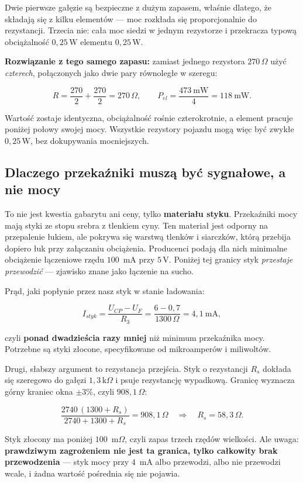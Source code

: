 \documentclass[a4paper,11pt]{article}
\newcommand{\ohm}{\,\Omega}
\newcommand{\kohm}{\,\mathrm{k}\Omega}
\newcommand{\volt}{\,\mathrm{V}}
\newcommand{\watt}{\,\mathrm{W}}
\begin{document}
Dwie pierwsze gałęzie są bezpieczne z dużym zapasem, właśnie dlatego, że składają
się z kilku elementów --- moc rozkłada się proporcjonalnie do rezystancji. Trzecia
nie: cała moc siedzi w jednym rezystorze i przekracza typową obciążalność
$0{,}25\watt$ elementu $0{,}25\watt$.

\textbf{Rozwiązanie z tego samego zapasu:} zamiast jednego rezystora $270\ohm$
użyć \emph{czterech}, połączonych jako dwie pary równoległe w szeregu:

\[
R=\frac{270}{2}+\frac{270}{2}=270\ohm ,
\qquad
P_{el}=\frac{473\ \mathrm{mW}}{4}=118\ \mathrm{mW}.
\]

Wartość zostaje identyczna, obciążalność rośnie czterokrotnie, a element pracuje
poniżej połowy swojej mocy. Wszystkie rezystory pojazdu mogą więc być zwykłe
$0{,}25\watt$, bez dokupywania mocniejszych.

\subsection{Dlaczego przekaźniki muszą być sygnałowe, a nie mocy}
\label{sec:przekazniki}

To nie jest kwestia gabarytu ani ceny, tylko \textbf{materiału styku}. Przekaźniki
mocy mają styki ze stopu srebra z tlenkiem cyny. Ten materiał jest odporny na
przepalenie łukiem, ale pokrywa się warstwą tlenków i siarczków, którą przebija
dopiero łuk przy załączaniu obciążenia. Producenci podają dla nich minimalne
obciążenie łączeniowe rzędu $100$~mA przy $5\volt$. Poniżej tej granicy styk
\emph{przestaje przewodzić} --- zjawisko znane jako łączenie na sucho.

Prąd, jaki popłynie przez nasz styk w stanie ładowania:

\[
I_{styk}=\frac{U_{CP}-U_{F}}{R_3}=\frac{6-0{,}7}{1300\ohm}=4{,}1\ \mathrm{mA},
\]

czyli \textbf{ponad dwadzieścia razy mniej} niż minimum przekaźnika mocy. Potrzebne
są styki złocone, specyfikowane od mikroamperów i miliwoltów.

Drugi, słabszy argument to rezystancja przejścia. Styk o rezystancji $R_s$ dokłada
się szeregowo do gałęzi $1{,}3\kohm$ i psuje rezystancję wypadkową. Granicę
wyznacza górny kraniec okna $\pm3\%$, czyli $908{,}1\ohm$:

\[
\frac{2740\,(1300+R_s)}{2740+1300+R_s}=908{,}1\ohm
\quad\Longrightarrow\quad
R_s = 58{,}3\ohm .
\]

Styk złocony ma poniżej $100$~m$\Omega$, czyli zapas trzech rzędów wielkości. Ale
uwaga: \textbf{prawdziwym zagrożeniem nie jest ta granica, tylko całkowity brak
przewodzenia} --- styk mocy przy $4$~mA albo przewodzi, albo nie przewodzi wcale,
i żadna wartość pośrednia się nie pojawia.
\end{document}
